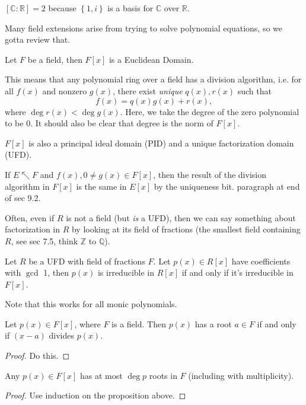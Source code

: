 \documentclass[10pt]{report}
\begin{document}
\begin{ex}[]
	$[\mathbb{C}:\mathbb{R}]=2$ because $\left\{ 1,i \right\}$ is a basis for $\mathbb{C}$ over $\mathbb{R}$.
\end{ex}

Many field extensions arise from trying to solve polynomial equations, so we gotta review that.

\begin{thrm}[]
	Let $F$ be a field, then $F[x]$ is a Euclidean Domain.
\end{thrm}

This means that any polynomial ring over a field has a division algorithm, i.e. for all $f(x)$ and nonzero $g(x)$, there exist \textit{unique} $q(x), r(x)$ such that
\[
	f(x)=q(x)g(x)+r(x),
\] where $\deg r(x) < \deg g(x)$. Here, we take the degree of the zero polynomial to be 0. It should also be clear that degree is the norm of $F[x]$.

\begin{cor}
	$F[x]$ is also a principal ideal domain (PID) and a unique factorization domain (UFD).
\end{cor}

If $E \nwarrow F$ and $f(x), 0 \neq g(x) \in F[x]$, then the result of the division algorithm in $F[x]$ is the same in $E[x]$ by the uniqueness bit. {\color{red}paragraph at end of sec 9.2.}

Often, even if $R$ is not a field (but \textit{is} a UFD), then we can say something about factorization in $R$ by looking at its field of fractions {\color{red}(the smallest field containing $R$, see sec 7.5, think $\mathbb{Z}$ to $\mathbb{Q}$).}

\begin{lem}
	Let $R$ be a UFD with field of fractions $F$. Let $p(x) \in R[x]$ have coefficients with $\gcd$ 1, then $p(x)$ is irreducible in $R[x]$ if and only if it's irreducible in $F[x]$.
\end{lem}

Note that this works for all monic polynomials.

\begin{prop}
	Let $p(x) \in F[x]$, where $F$ is a field. Then $p(x)$ has a root $a \in F$ if and only if $(x-a)$ divides $p(x)$.
\end{prop}
\begin{proof}
	{\color{red}Do this.}
\end{proof}

\begin{cor}
	Any $p(x) \in F[x]$ has at most $\deg p$ roots in $F$ (including with multiplicity).
\end{cor}
\begin{proof}
	Use induction on the proposition above.
\end{proof}
\end{document}
